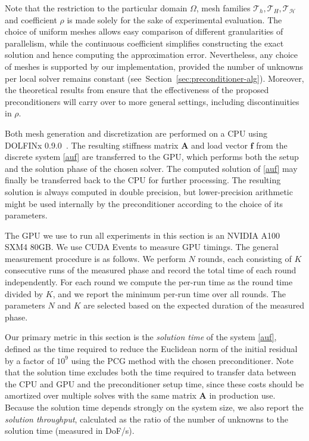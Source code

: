 \documentclass[11pt]{article}
\theoremstyle{definition}
\theoremstyle{theorem}
\begin{document}
Note that the restriction to the particular domain $\Omega$, mesh families
$\mathcal{T}_h, \mathcal{T}_H, \mathcal{T}_{\mathcal{H}}$ and coefficient $\rho$ is made solely for
the sake of experimental evaluation. The choice of uniform meshes allows
easy comparison of different granularities of parallelism, while the continuous coefficient
simplifies constructing the exact solution and hence computing the approximation error.
Nevertheless, any choice of meshes is supported by our implementation,
provided the number of unknowns per local solver remains constant
(see~Section~\ref{sec:preconditioner-alg}). Moreover, the theoretical results
from \cite{Przykry, Przykry-hp} ensure that the effectiveness of the proposed
preconditioners will carry over to more general settings, including
discontinuities in $\rho$.

Both mesh generation and discretization are performed on a CPU using DOLFINx 0.9.0~\cite{dolfinx}.
The resulting stiffness matrix $\bm{A}$ and load vector $\bm{f}$ from the discrete system
\eqref{auf} are transferred to the GPU, which performs both the setup
and the solution phase of the chosen solver. The computed solution of \eqref{auf}
may finally be transferred back to the CPU for further processing. The resulting solution
is always computed in double precision, but lower\nobreakdash-precision arithmetic
might be used internally by the preconditioner according to the choice of
its parameters.

The GPU we use to run all experiments in this section is an NVIDIA A100 SXM4 80GB.
We use CUDA Events \cite[Section 3.2.8.8]{cuda-guide} to measure GPU timings.
The general measurement procedure is as follows. We perform $N$ rounds, each
consisting of $K$ consecutive runs of the measured phase and record the total
time of each round independently. For each round we compute the per-run time
as the round time divided by $K$, and we report the minimum per-run time over
all rounds. The parameters $N$ and $K$ are selected based on the expected
duration of the measured phase.

Our primary metric in this section is the \emph{solution time} of the system \eqref{auf},
defined as the time required to reduce the Euclidean norm of the initial residual
by a factor of $10^9$ using the PCG method with the chosen preconditioner.
Note that the solution time excludes both the time required to transfer
data between the CPU and GPU and the preconditioner setup time, since these costs
should be amortized over multiple solves with the same matrix $\bm{A}$ in
production use. Because the solution time depends strongly on the system size,
we also report the \emph{solution throughput}, calculated as the
ratio of the number of unknowns to the solution time (measured in DoF/s).
\end{document}
